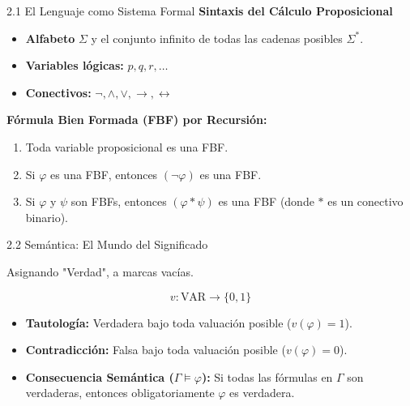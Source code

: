 \documentclass[10pt, aspectratio=169]{beamer}
\begin{document}
\begin{frame}{2.1 El Lenguaje como Sistema Formal}
    \textbf{Sintaxis del Cálculo Proposicional}
    
    \vspace{0.4cm}
    \begin{itemize}
        \item \textbf{Alfabeto} $\Sigma$ y el conjunto infinito de todas las cadenas posibles $\Sigma^*$.
        \item \textbf{Variables lógicas:} $p, q, r, \dots$
        \item \textbf{Conectivos:} $\neg, \land, \lor, \to, \leftrightarrow$
    \end{itemize}

    \vspace{0.6cm}
    \alert{\textbf{Fórmula Bien Formada (FBF) por Recursión:}}
    \begin{enumerate}
        \item Toda variable proposicional es una FBF.
        \item Si $\varphi$ es una FBF, entonces $(\neg\varphi)$ es una FBF.
        \item Si $\varphi$ y $\psi$ son FBFs, entonces $(\varphi * \psi)$ es una FBF (donde $*$ es un conectivo binario).
    \end{enumerate}
\end{frame}

\begin{frame}{2.2 Semántica: El Mundo del Significado}
    \begin{center}
        \Large Asignando "Verdad", a marcas vacías.
        
        \vspace{0.4cm}
        \begin{equation*}
            v: \text{VAR} \to \{0, 1\}
        \end{equation*}
        \normalsize
    \end{center}
    
    \vspace{0.4cm}
    \begin{itemize}
        \item \textbf{Tautología:} Verdadera bajo toda valuación posible ($v(\varphi) = 1$).
        \item \textbf{Contradicción:} Falsa bajo toda valuación posible ($v(\varphi) = 0$).
        \item \textbf{Consecuencia Semántica ($\Gamma \models \varphi$):} Si todas las fórmulas en $\Gamma$ son verdaderas, entonces obligatoriamente $\varphi$ es verdadera.
    \end{itemize}
\end{frame}
\end{document}
